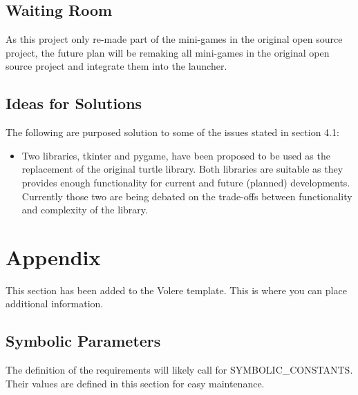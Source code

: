 \documentclass[12pt, titlepage]{article}
\begin{document}
\subsection{Waiting Room}

As this project only re-made part of the mini-games in the original open source project, the future plan will be remaking all mini-games in the original open source project and integrate them into the launcher.

\subsection{Ideas for Solutions}

The following are purposed solution to some of the issues stated in section 4.1:
\begin{itemize}
    \item Two libraries, tkinter and pygame, have been proposed to be used as the replacement of the original turtle library. Both libraries are suitable as they provides enough functionality for current and future (planned) developments. Currently those two are being debated on the trade-offs between functionality and complexity of the library.
\end{itemize}





\newpage

\section{Appendix}

This section has been added to the Volere template.  This is where you can place
additional information.

\subsection{Symbolic Parameters}

The definition of the requirements will likely call for SYMBOLIC\_CONSTANTS.
Their values are defined in this section for easy maintenance.
\end{document}

